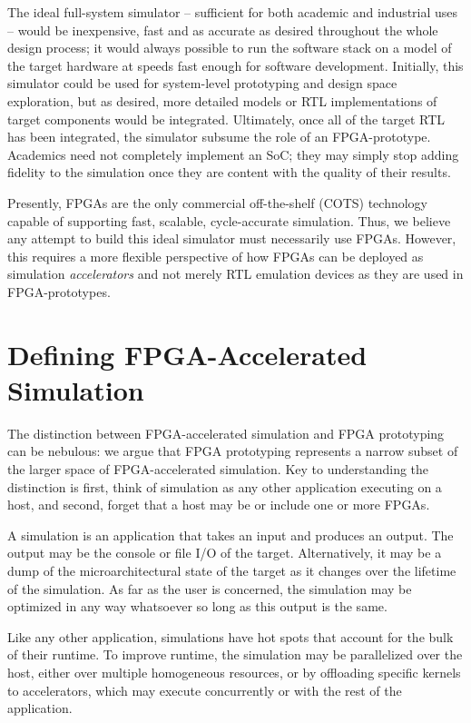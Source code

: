 The ideal full-system simulator -- sufficient for both academic and industrial
uses -- would be inexpensive, fast and as accurate as desired throughout the
whole design process; it would always possible to run the software stack on a
model of the target hardware at speeds fast enough for software development.
Initially, this simulator could be used for system-level prototyping and design
space exploration, but as desired, more detailed models or RTL implementations
of target components would be integrated. Ultimately, once all of the target
RTL has been integrated, the simulator subsume the role of an FPGA-prototype.
Academics need not completely implement an SoC; they may simply stop adding
fidelity to the simulation once they are content with the quality of their
results.

Presently, FPGAs are the only commercial off-the-shelf (COTS) technology
capable of supporting fast, scalable, cycle-accurate simulation. Thus, we
believe any attempt to build this ideal simulator must necessarily use FPGAs.
However, this requires a more flexible perspective of how FPGAs can be deployed as
simulation \emph{accelerators} and not merely RTL emulation devices as they are
used in FPGA-prototypes.

\section{Defining FPGA-Accelerated Simulation}

The distinction between FPGA-accelerated simulation and FPGA prototyping can be
nebulous: we argue that FPGA prototyping represents a narrow subset of the larger
space of FPGA-accelerated simulation. Key to understanding the distinction is
first, think of simulation as any other application executing on a host, and
second, forget that a host may be or include one or more FPGAs.

A simulation is an application that takes an input and produces an output.  The
output may be the console or file I/O of the target.  Alternatively, it may be
a dump of the microarchitectural state of the target as it changes over the
lifetime of the simulation.  As far as the user is concerned, the simulation
may be optimized in any way whatsoever so long as this output is the same.

Like any other application, simulations have hot spots that account for the bulk
of their runtime. To improve runtime, the simulation may be parallelized over
the host, either over multiple homogeneous resources, or by offloading specific
kernels to accelerators, which may execute concurrently or with the rest
of the application.

